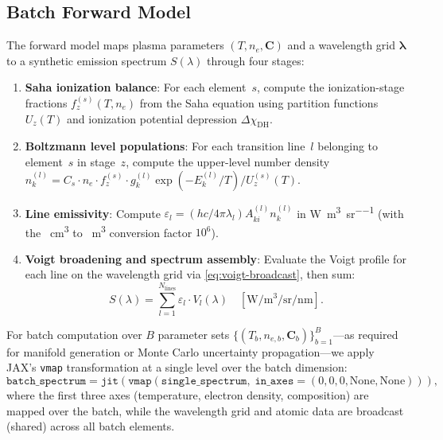 \documentclass[preprint,12pt,authoryear]{elsarticle}
\begin{document}
\subsection{Batch Forward Model}
\label{sec:batch}

The forward model maps plasma parameters $(T, n_e, \bm{C})$ and a wavelength grid $\bm{\lambda}$ to a synthetic emission spectrum $S(\lambda)$ through four stages:
\begin{enumerate}
  \item \textbf{Saha ionization balance}: For each element~$s$, compute the ionization-stage fractions $f_z^{(s)}(T, n_e)$ from the Saha equation using partition functions $U_z(T)$ and ionization potential depression $\Delta\chi_\mathrm{DH}$.
  \item \textbf{Boltzmann level populations}: For each transition line~$l$ belonging to element~$s$ in stage~$z$, compute the upper-level number density $n_k^{(l)} = C_s \cdot n_e \cdot f_z^{(s)} \cdot g_k^{(l)} \exp(-E_k^{(l)} / T) / U_z^{(s)}(T)$.
  \item \textbf{Line emissivity}: Compute $\varepsilon_l = (hc / 4\pi\lambda_l) A_{ki}^{(l)} n_k^{(l)}$ in \si{\watt\per\cubic\metre\per\steradian} (with the \si{\per\cubic\centi\metre} to \si{\per\cubic\metre} conversion factor $10^6$).
  \item \textbf{Voigt broadening and spectrum assembly}: Evaluate the Voigt profile for each line on the wavelength grid via \cref{eq:voigt-broadcast}, then sum:
    \begin{equation}
      S(\lambda) = \sum_{l=1}^{N_\mathrm{lines}} \varepsilon_l \cdot V_l(\lambda) \quad [\si{\watt\per\cubic\metre\per\steradian\per\nano\metre}].
      \label{eq:spectrum}
    \end{equation}
\end{enumerate}

For batch computation over $B$ parameter sets $\{(T_b, n_{e,b}, \bm{C}_b)\}_{b=1}^B$---as required for manifold generation or Monte Carlo uncertainty propagation---we apply JAX's \texttt{vmap} transformation at a single level over the batch dimension:
\begin{equation}
  \texttt{batch\_spectrum} = \texttt{jit}(\texttt{vmap}(\texttt{single\_spectrum},\; \texttt{in\_axes}=(0, 0, 0, \text{None}, \text{None}))),
  \label{eq:vmap}
\end{equation}
where the first three axes (temperature, electron density, composition) are mapped over the batch, while the wavelength grid and atomic data are broadcast (shared) across all batch elements.
\end{document}
